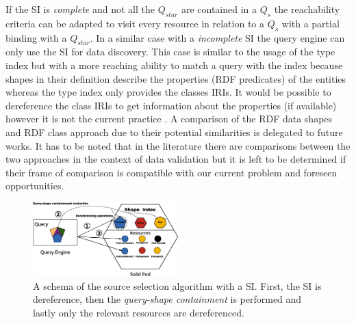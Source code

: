 If the SI is \emph{complete} and not all the $Q_{star}$ are contained in a $Q_{s}$ the reachability criteria can be adapted
to visit every resource in relation to a $Q_{s}$ with a partial binding with a $Q_{star}$.
In a similar case with a \emph{incomplete} SI the query engine can only use the SI for data discovery.
This case is similar to the usage of the type index but with a more reaching ability to match a query with the index 
because shapes in their definition describe the properties (RDF predicates) of the entities whereas the type index only provides the classes IRIs.
It would be possible to dereference the class IRIs to get information about the properties (if available) however it is not the current practice \cite{Taelman2023}.
A comparison of the RDF data shapes and RDF class approach due to their potential similarities is delegated to future works.
It has to be noted that in the literature \cite{demeester_swj_2021} there are comparisons 
between the two approaches in the context of data validation but it is left to be determined if their frame of comparison is compatible with our current problem
and foreseen opportunities.

\begin{figure}
    \centering
    \includegraphics[width=0.5\textwidth]{figure/shape_containement}
    \caption{A schema of the source selection algorithm with a SI. First, the SI is dereference, 
    then the \emph{query-shape containment} is performed and lastly only the relevant resources are dereferenced.}
    \label{fig:shape_index}
\end{figure}